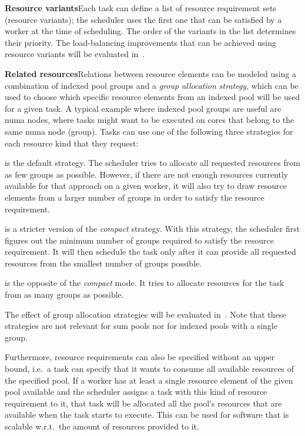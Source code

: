 \vspace{2mm}\textbf{Resource variants}\enskip{}Each task can define a list of
resource requirement sets (resource variants); the scheduler uses the first one that can be
satisfied by a worker at the time of scheduling. The order of the variants in the list determines
their priority. The load-balancing improvements that can be achieved using resource variants will
be evaluated in~.

\vspace{2mm}\textbf{Related resources}\enskip{}Relations between resource
elements can be modeled using a combination of indexed pool groups and a \emph{group allocation strategy},
which can be used to choose which specific resource elements from an indexed pool will be used for
a given task. A typical example where indexed pool groups are useful are \gls{numa}
nodes, where tasks might want to be executed on cores that belong to the same
\gls{numa} node (group). Tasks can use one of the following three strategies for each resource kind
that they request:

\begin{description}[wide=0pt,itemsep=0pt,topsep=1pt]
	\item [Compact] is the default strategy. The scheduler tries to allocate all requested
	      resources from as few groups as possible. However, if there are not enough resources currently
	      available for that approach on a given worker, it will also try to draw resource elements from a
	      larger number of groups in order to satisfy the resource requirement.
	\item [Strict compact] is a stricter version of the \emph{compact} strategy. With this
	      strategy, the scheduler first figures out the minimum number of groups required to satisfy the
	      resource requirement. It will then schedule the task only after it can provide all requested
	      resources from the smallest number of groups possible.
	\item [Scatter] is the opposite of the \emph{compact} mode. It tries to allocate resources
	      for the task from as many groups as possible.
\end{description}

The effect of group allocation strategies will be evaluated in~. Note that
these strategies are not relevant for sum pools nor for indexed pools with a single group.

Furthermore, resource requirements can also be specified without an upper bound, i.e.\ a task can
specify that it wants to consume all available resources of the specified pool. If a worker has at
least a single resource element of the given pool available and the scheduler assigns a task with
this kind of resource requirement to it, that task will be allocated all the pool's resources that
are available when the task starts to execute. This can be used for software that is scalable
w.r.t.\ the amount of resources provided to it.

